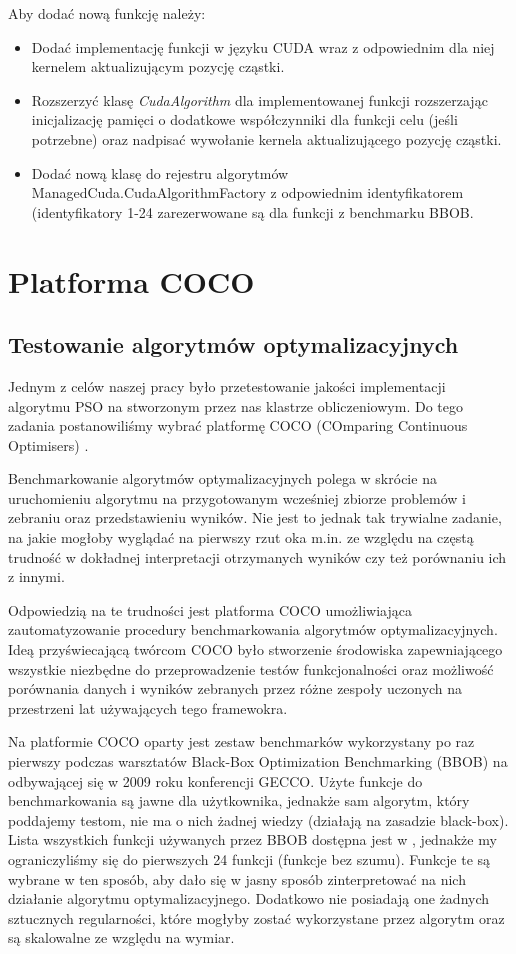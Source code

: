 \documentclass[12pt, twoside, openany, abstract=on]{report}
\theoremstyle{definition}
\begin{document}
Aby dodać nową funkcję należy:
\begin{itemize}
\item Dodać implementację funkcji w języku CUDA wraz z odpowiednim dla niej kernelem aktualizującym pozycję cząstki.
\item Rozszerzyć klasę \textit{CudaAlgorithm} dla implementowanej funkcji rozszerzając inicjalizację pamięci o dodatkowe współczynniki dla funkcji celu (jeśli potrzebne) oraz nadpisać wywołanie kernela aktualizującego pozycję cząstki.
\item Dodać nową klasę do rejestru algorytmów ManagedCuda.CudaAlgorithmFactory z odpowiednim identyfikatorem (identyfikatory 1-24 zarezerwowane są dla funkcji z benchmarku BBOB.
\end{itemize}
 
 
\chapter{Platforma COCO}

\section{Testowanie algorytmów optymalizacyjnych}
Jednym z celów naszej pracy było przetestowanie jakości implementacji algorytmu PSO na stworzonym przez nas klastrze obliczeniowym. Do tego zadania postanowiliśmy wybrać platformę COCO (COmparing Continuous Optimisers) \cite{Coco}.

Benchmarkowanie algorytmów optymalizacyjnych polega w skrócie na uruchomieniu algorytmu na przygotowanym wcześniej zbiorze problemów i zebraniu oraz przedstawieniu wyników. Nie jest to jednak tak trywialne zadanie, na jakie mogłoby wyglądać na pierwszy rzut oka m.in. ze względu na częstą trudność w dokładnej interpretacji otrzymanych wyników czy też porównaniu ich z innymi.

Odpowiedzią na te trudności jest platforma COCO umożliwiająca zautomatyzowanie procedury benchmarkowania algorytmów optymalizacyjnych. Ideą przyświecającą twórcom COCO było stworzenie środowiska zapewniającego wszystkie niezbędne do przeprowadzenie testów funkcjonalności oraz możliwość porównania danych i wyników zebranych przez różne zespoły uczonych na przestrzeni lat używających tego framewokra. 


Na platformie COCO oparty jest zestaw benchmarków wykorzystany po raz pierwszy podczas warsztatów Black-Box Optimization Benchmarking (BBOB) na odbywającej się w 2009 roku konferencji GECCO.
Użyte funkcje do benchmarkowania są jawne dla użytkownika, jednakże sam algorytm, który poddajemy testom, nie ma o nich żadnej wiedzy (działają na zasadzie black-box). Lista wszystkich funkcji używanych przez BBOB dostępna jest w \cite{Coco}, jednakże my ograniczyliśmy się do pierwszych 24 funkcji (funkcje bez szumu).
Funkcje te są wybrane w ten sposób, aby dało się w jasny sposób zinterpretować na nich działanie algorytmu optymalizacyjnego. Dodatkowo nie posiadają one żadnych sztucznych regularności, które mogłyby zostać wykorzystane przez algorytm oraz są skalowalne ze względu na wymiar.
\end{document}
